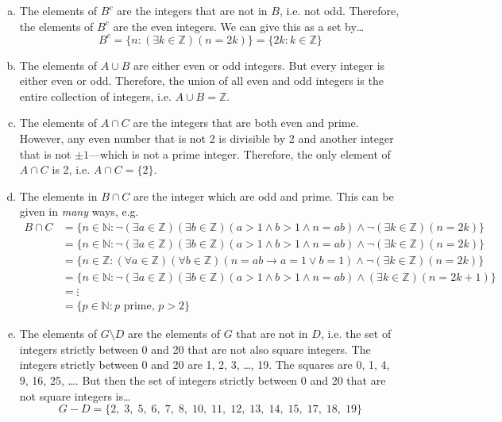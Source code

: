 \documentclass[11pt,letterpaper]{article}
\begin{document}
\sol
\begin{enumerate}[(a)]
\item The elements of $B^c$ are the integers that are not in $B$, i.e. not odd. Therefore, the elements of $B^c$ are the even integers. We can give this as a set by\dots
	\[
	B^c= \{ n \colon (\exists k \in \mathbb{Z})(n= 2k) \}= \{ 2k \colon k \in \mathbb{Z} \}
	\]

\item The elements of $A \cup B$ are either even or odd integers. But every integer is either even or odd. Therefore, the union of all even and odd integers is the entire collection of integers, i.e. $A \cup B= \mathbb{Z}$. \pspace

\item The elements of $A \cap C$ are the integers that are both even and prime. However, any even number that is not 2 is divisible by 2 and another integer that is not $\pm 1$---which is not a prime integer. Therefore, the only element of $A \cap C$ is 2, i.e. $A \cap C= \{ 2 \}$. \pspace

\item The elements in $B \cap C$ are the integer which are odd and prime. This can be given in \textit{many} ways, e.g.
	\[
	\begin{aligned}
	B \cap C&= \{ n \in \mathbb{N} \colon \neg(\exists a \in \mathbb{Z})(\exists b \in \mathbb{Z})(a > 1 \wedge b > 1 \wedge n= ab) \wedge \neg(\exists k \in \mathbb{Z})(n= 2k) \} \\
	 &= \{ n \in \mathbb{N} \colon \neg(\exists a \in \mathbb{Z})(\exists b \in \mathbb{Z})(a > 1 \wedge b > 1 \wedge n= ab) \wedge \neg(\exists k \in \mathbb{Z})(n= 2k) \} \\
	 &= \{ n \in \mathbb{Z} \colon (\forall a \in \mathbb{Z})(\forall b \in \mathbb{Z})(n= ab \to a= 1 \vee b= 1) \wedge \neg(\exists k \in \mathbb{Z})(n= 2k) \} \\
	 &= \{ n \in \mathbb{N} \colon \neg(\exists a \in \mathbb{Z})(\exists b \in \mathbb{Z})(a > 1 \wedge b > 1 \wedge n= ab) \wedge (\exists k \in \mathbb{Z})(n= 2k + 1) \} \\
	 &= \vdots \\
	&= \{ p \in \mathbb{N} \colon p \text{ prime},\, p > 2 \} 
	\end{aligned}
	\] \pspace

\item The elements of $G \setminus D$ are the elements of $G$ that are not in $D$, i.e. the set of integers strictly between 0 and 20 that are not also square integers. The integers strictly between 0 and 20 are 1, 2, 3, \ldots, 19. The squares are 0, 1, 4, 9, 16, 25, \ldots. But then the set of integers strictly between 0 and 20 that are not square integers is\dots
	\[
	G - D= \{ 2, \; 3, \; 5, \; 6, \; 7, \; 8, \; 10, \; 11, \; 12, \; 13, \; 14, \; 15, \; 17, \; 18, \; 19 \}
	\] \pspace


\end{enumerate}
\end{document}
